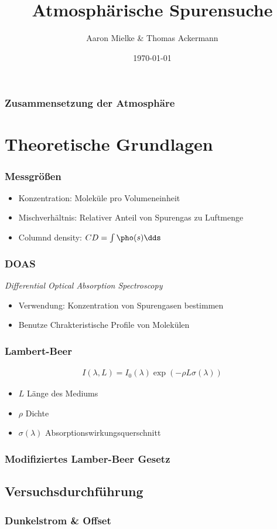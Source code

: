\documentclass{beamer}
\title{Atmosphärische Spurensuche}
\author{Aaron Mielke \& Thomas Ackermann}
\date{\today}
\begin{document}
\maketitle


\begin{frame}
\frametitle{Zusammensetzung der Atmosphäre}
    \section{Theoretische Grundlagen}

\end{frame}

\begin{frame}
\frametitle{Messgrößen}
    \begin{itemize}
        \item Konzentration: Moleküle pro Volumeneinheit
        \item Mischverhältnis: Relativer Anteil von Spurengas zu Luftmenge
        \item Columnd density: $CD = \int \pho (s) \dds$
    \end{itemize}
\end{frame}

\begin{frame}
    \frametitle{DOAS}
    \textit{Differential Optical Absorption Spectroscopy}
    \begin{itemize}
        \item Verwendung: Konzentration von Spurengasen bestimmen
        \item Benutze Chrakteristische Profile von Molekülen
    \end{itemize}
\end{frame}

\begin{frame}
    \frametitle{Lambert-Beer}
    \begin{align}
    I(\lambda, L) = I_0 (\lambda) \exp (- \rho  L \sigma (\lambda) )
    \end{align}
    \begin{itemize}
        \item $L$ Länge des Mediums
        \item $\rho$ Dichte
        \item $\sigma (\lambda)$ Absorptionswirkungsquerschnitt
    \end{itemize}
\end{frame}

\begin{frame}
    \frametitle{Modifiziertes Lamber-Beer Gesetz}

\end{frame}

\begin{frame}
    \section{Versuchsdurchführung}
    \frametitle{Dunkelstrom \& Offset}
\end{frame}
\end{document}
